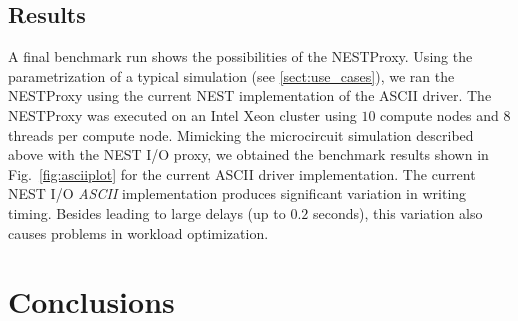 \documentclass[]{YIC2015}
\begin{document}
\subsection{Results}

A final benchmark run shows the possibilities of the NESTProxy.  Using
the parametrization of a typical simulation (see
\ref{sect:use_cases}), we ran the NESTProxy using the current NEST
implementation of the ASCII driver.
The NESTProxy was executed on an Intel Xeon cluster using $10$ compute
nodes and $8$ threads per compute node. Mimicking the microcircuit
simulation described above with the NEST I/O proxy, we obtained the
benchmark results shown in Fig.~\ref{fig:asciiplot} for the current
ASCII driver implementation. The current NEST I/O \emph{ASCII}
implementation produces significant variation in writing timing.
Besides leading to large delays (up to $0.2$ seconds), this variation
also causes problems in workload optimization.


\section{Conclusions}
\end{document}
